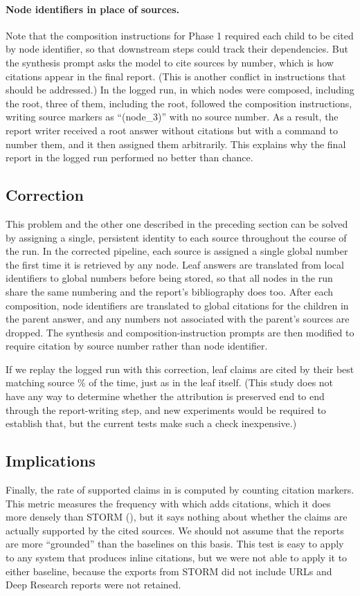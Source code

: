 \paragraph{Node identifiers in place of sources.}
Note that the composition instructions for Phase 1 required each child to be cited by node identifier, so that downstream steps could track their dependencies. But the synthesis prompt asks the model to cite sources by number, which is how citations appear in the final report. (This is another conflict in instructions that should be addressed.) In the logged run, in which \dagParents{} nodes were composed, including the root, three of them, including the root, followed the composition instructions, writing source markers as ``(node\_3)'' with no source number. As a result, the report writer received a root answer without citations but with a command to number them, and it then assigned them arbitrarily. This explains why the final report in the logged run performed no better than chance.

\subsection{Correction}
This problem and the other one described in the preceding section can be solved by assigning a single, persistent identity to each source throughout the course of the run. In the corrected pipeline, each source is assigned a single global number the first time it is retrieved by any node. Leaf answers are translated from local identifiers to global numbers before being stored, so that all nodes in the run share the same numbering and the report's bibliography does too. After each composition, node identifiers are translated to global citations for the children in the parent answer, and any numbers not associated with the parent's sources are dropped. The synthesis and composition-instruction prompts are then modified to require citation by source number rather than node identifier.

If we replay the logged run with this correction, leaf claims are cited by their best matching source \atFixBestCitedPct\% of the time, just as in the leaf itself. (This study does not have any way to determine whether the attribution is preserved end to end through the report-writing step, and new experiments would be required to establish that, but the current tests make such a check inexpensive.)

\subsection{Implications}
Finally, the rate of supported claims in  is computed by counting citation markers. This metric measures the frequency with which \sys{} adds citations, which it does more densely than STORM (), but it says nothing about whether the claims are actually supported by the cited sources. We should not assume that the reports are more ``grounded'' than the baselines on this basis. This test is easy to apply to any system that produces inline citations, but we were not able to apply it to either baseline, because the exports from STORM did not include URLs and Deep Research reports were not retained.
